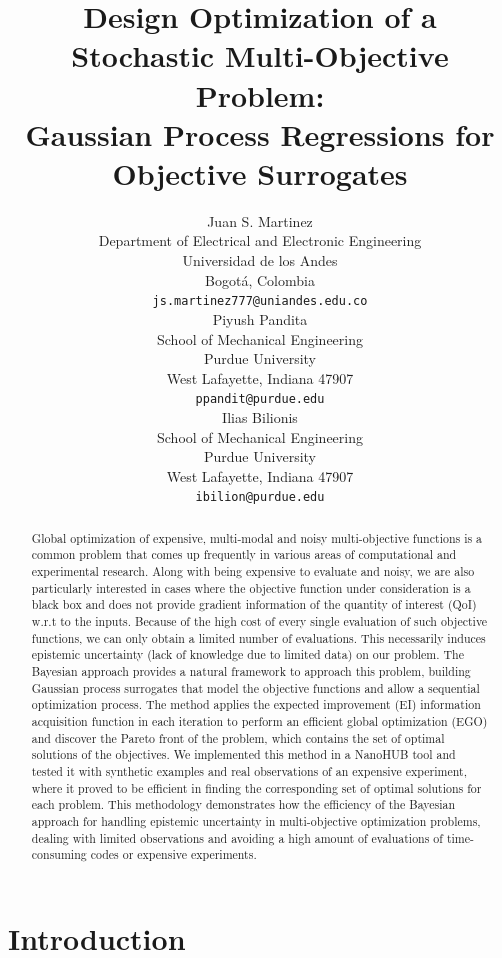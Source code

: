 \documentclass{article}
\title{Design Optimization of a Stochastic Multi-Objective Problem: \\Gaussian Process Regressions for Objective Surrogates}
\author{
  Juan S. Martinez\\
  Department of Electrical and Electronic Engineering\\
  Universidad de los Andes\\
  Bogotá, Colombia \\
  \texttt{js.martinez777@uniandes.edu.co} \\
  \And
  Piyush Pandita \\
  School of Mechanical Engineering \\
  Purdue University \\
  West Lafayette, Indiana 47907\\
  \texttt{ppandit@purdue.edu} \\
  \AND
  Ilias Bilionis \\
  School of Mechanical Engineering \\
  Purdue University \\
  West Lafayette, Indiana 47907\\
  \texttt{ibilion@purdue.edu} \\
}
\begin{document}

\maketitle

\begin{abstract}
    Global optimization of expensive, multi-modal and noisy multi-objective functions is a common problem that comes up frequently in various areas of computational and experimental research. Along with being expensive to evaluate and noisy, we are also particularly interested in cases where the objective function under consideration is a black box and does not provide gradient information of the quantity of interest (QoI) w.r.t to the inputs. Because of the high cost of every single evaluation of such objective functions, we can only obtain a limited number of evaluations. This necessarily induces epistemic uncertainty (lack of knowledge due to limited data) on our problem. The Bayesian approach provides a natural framework to approach this problem, building Gaussian process surrogates that model the objective functions and allow a sequential optimization process. The method applies the expected improvement (EI) information acquisition function in each iteration to perform an efficient global optimization (EGO) and discover the Pareto front of the problem, which contains the set of optimal solutions of the objectives. We implemented this method in a NanoHUB tool and tested it with synthetic examples and real observations of an expensive experiment, where it proved to be efficient in finding the corresponding set of optimal solutions for each problem. This methodology demonstrates how the efficiency of the Bayesian approach for handling epistemic uncertainty in multi-objective optimization problems, dealing with limited observations and avoiding a high amount of evaluations of time-consuming codes or expensive experiments.
\end{abstract}

\section{Introduction}
\end{document}
